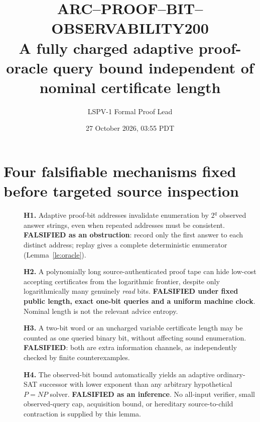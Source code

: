 \documentclass[11pt]{article}
\title{ARC--PROOF--BIT--OBSERVABILITY200\\
\large A fully charged adaptive proof-oracle query bound independent of nominal certificate length}
\author{LSPV-1 Formal Proof Lead}
\date{27 October 2026, 03:55 PDT}
\begin{document}
\maketitle
\begin{center}
\end{center}

\section{Four falsifiable mechanisms fixed before targeted source inspection}
\begin{description}
\item[] \textbf{H1.} Adaptive proof-bit addresses invalidate
enumeration by $2^{q}$ observed answer strings, even when repeated
addresses must be consistent. \textbf{FALSIFIED as an obstruction}:
record only the first answer to each distinct address; replay gives a
complete deterministic enumerator (Lemma~\ref{le:oracle}).
\item[] \textbf{H2.} A polynomially long source-authenticated proof tape
can hide low-cost accepting certificates from the logarithmic frontier,
despite only logarithmically many genuinely \emph{read} bits.
\textbf{FALSIFIED under fixed public length, exact one-bit queries and
a uniform machine clock}. Nominal length is not the relevant advice entropy.
\item[] \textbf{H3.} A two-bit word or an uncharged variable certificate
length may be counted as one queried binary bit, without affecting sound
enumeration. \textbf{FALSIFIED}: both are extra information channels,
as independently checked by finite counterexamples.
\item[] \textbf{H4.} The observed-bit bound automatically yields an
adaptive ordinary-SAT successor with lower exponent than any arbitrary
hypothetical $P=NP$ solver. \textbf{FALSIFIED as an inference}.
No all-input verifier, small observed-query cap, acquisition bound,
or hereditary source-to-child contraction is supplied by this lemma.
\end{description}
\end{document}

